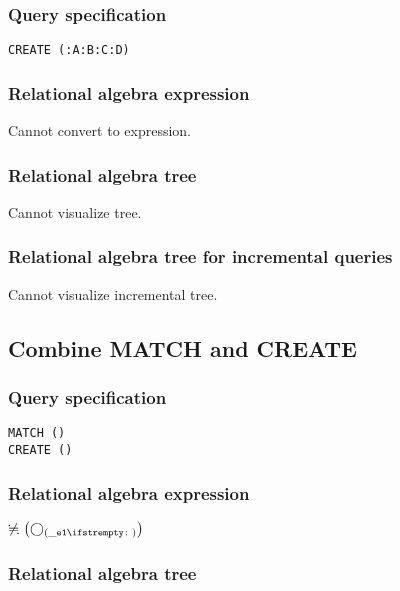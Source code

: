 \subsubsection*{Query specification}

\begin{lstlisting}
CREATE (:A:B:C:D)
\end{lstlisting}

\subsubsection*{Relational algebra expression}

Cannot convert to expression.

\subsubsection*{Relational algebra tree}

Cannot visualize tree.

\subsubsection*{Relational algebra tree for incremental queries}

Cannot visualize incremental tree.

\subsection{Combine MATCH and CREATE}

\subsubsection*{Query specification}

\begin{lstlisting}
MATCH ()
CREATE ()
\end{lstlisting}

\subsubsection*{Relational algebra expression}

$\alldifferent{} \left(\getvertices{\_e1}{}\right)$

\subsubsection*{Relational algebra tree}

